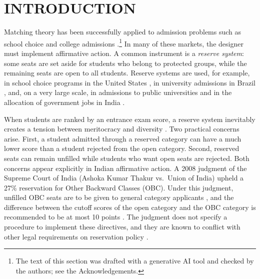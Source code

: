 \documentclass[a4paper,twoside]{article}
\theoremstyle{definition}
\newcommand{\aidraft}{\footnote{The text of this section was drafted with a generative AI tool \cite{Anthropic26a} and checked by the authors; see the Acknowledgements.}}
\begin{document}
\section{\uppercase{Introduction}}
\label{sec:introduction}

Matching theory has been successfully applied to admission problems such as school
choice and college admissions
\cite{GaSh62a,RoSo90a,BaSo99a,AbSo03b}.\aidraft{}
In many of these markets, the designer must implement affirmative action.
A common instrument is a \emph{reserve system}: some seats are set aside for students
who belong to protected groups, while the remaining seats are open to all students.
Reserve systems are used, for example, in school choice programs in the United States
\cite{DKPS18a,DPS20a}, in university admissions in Brazil \cite{AyBo21a}, and, on a
very large scale, in admissions to public universities and in the allocation of
government jobs in India \cite{BCC+19b,SoYe22a,AyTu23a}.

When students are ranked by an entrance exam score, a reserve system inevitably
creates a tension between meritocracy and diversity \cite{imamura2025meritocracy}.
Two practical concerns arise.
First, a student admitted through a reserved category can have a much lower score than
a student rejected from the open category.
Second, reserved seats can remain unfilled while students who want open seats are
rejected.
Both concerns appear explicitly in Indian affirmative action.
A 2008 judgment of the Supreme Court of India (Ashoka Kumar Thakur vs.\ Union of India)
upheld a 27\% reservation for Other Backward Classes (OBC).
Under this judgment, unfilled OBC seats are to be given to general category applicants \cite{AyTu23a}, and the difference between the cutoff
scores of the open category and the OBC category is recommended to be at most 10 points
\cite{AyTu23b}.
The judgment does not specify a procedure to implement these directives, and
they are known to conflict with other legal requirements on reservation policy
\cite{AyTu23b}.
\end{document}
